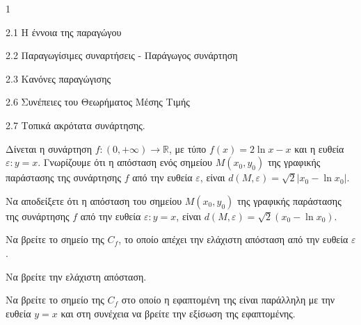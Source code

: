 \begin{ylh}{1}
    \item 2.1 Η έννοια της παραγώγου
    \item 2.2 Παραγωγίσιμες συναρτήσεις - Παράγωγος συνάρτηση
    \item 2.3 Κανόνες παραγώγισης
    \item 2.6 Συνέπειες του Θεωρήματος Μέσης Τιμής
    \item 2.7 Τοπικά ακρότατα συνάρτησης.
\end{ylh}
Δίνεται η συνάρτηση $f:(0,+\infty) \rightarrow \mathbb{R}$, με τύπο $f(x) = 2 \ln x - x$ και η ευθεία $\varepsilon: y = x$.
Γνωρίζουμε ότι η απόσταση ενός σημείου $M(x_0,y_0)$ της γραφικής παράστασης της συνάρτησης $f$ από την ευθεία $\varepsilon$, είναι $d(M,\varepsilon) = \sqrt{2} |x_0 - \ln x_0|$.
\begin{alist}
\item Να αποδείξετε ότι η απόσταση του σημείου $M(x_0,y_0)$ της γραφικής παράστασης της συνάρτησης $f$ από την ευθεία $\varepsilon: y = x$, είναι $d(M,\varepsilon) = \sqrt{2} (x_0 - \ln x_0)$. 
\item \begin{rlist}
    \item Να βρείτε το σημείο της $C_f$, το οποίο απέχει την ελάχιστη απόσταση από την ευθεία $\varepsilon$. 
    \item Να βρείτε την ελάχιστη απόσταση. 
\end{rlist}
\item Να βρείτε το σημείο της $C_f$ στο οποίο η εφαπτομένη της είναι παράλληλη με την ευθεία $y = x$ και στη συνέχεια να βρείτε την εξίσωση της εφαπτομένης. 
\end{alist}